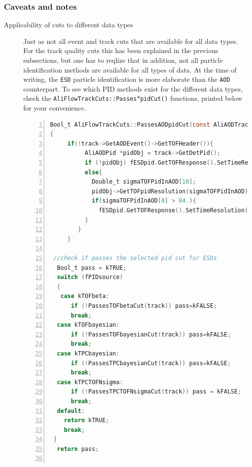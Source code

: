 \documentclass[a4paper]{book}
\numberwithin{equation}{subsection}
\begin{document}
\subsubsection{Caveats and notes}
\begin{description}
\item[Applicability of cuts to different data types] Just as not all event and track cuts that are available for all data types. For the track quality cuts this has been explained in the previous subsections, but one has to reqlize that in addition, not all particle identification methods are available for all types of data. At the time of writing, the \texttt{ESD} particle identification is more elaborate than the \texttt{AOD} counterpart. To see which PID methods exist for the different data types, check the \texttt{AliFlowTrackCuts::Passes$\ast$pidCut()} functions,  printed below for your convenience.

\begin{lstlisting}[language=C, numbers=left]
Bool_t AliFlowTrackCuts::PassesAODpidCut(const AliAODTrack* track )
{
     if(!track->GetAODEvent()->GetTOFHeader()){
          AliAODPid *pidObj = track->GetDetPid();
          if (!pidObj) fESDpid.GetTOFResponse().SetTimeResolution(84.);
          else{
            Double_t sigmaTOFPidInAOD[10];
            pidObj->GetTOFpidResolution(sigmaTOFPidInAOD);
            if(sigmaTOFPidInAOD[0] > 84.){
              fESDpid.GetTOFResponse().SetTimeResolution(sigmaTOFPidInAOD[0]); // use the electron TOF PID sigma as time resolution (including the T0 used)
          }
        }
     }

 //check if passes the selected pid cut for ESDs
  Bool_t pass = kTRUE;
  switch (fPIDsource)
  {
   case kTOFbeta:
      if (!PassesTOFbetaCut(track)) pass=kFALSE;
      break;
  case kTOFbayesian:
      if (!PassesTOFbayesianCut(track)) pass=kFALSE;
      break;
  case kTPCbayesian:
      if (!PassesTPCbayesianCut(track)) pass=kFALSE;
      break;
  case kTPCTOFNsigma:
      if (!PassesTPCTOFNsigmaCut(track)) pass = kFALSE;
      break;
  default:
    return kTRUE;
    break;
 }
  return pass;


\end{lstlisting}
\end{description}
\end{document}
